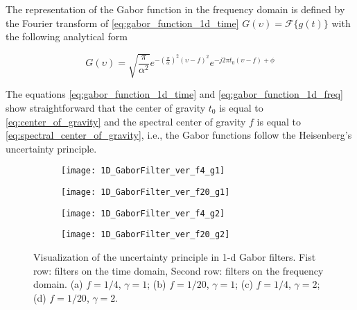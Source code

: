 The representation of the Gabor function in the frequency domain is defined by the Fourier transform of \eqref{eq:gabor_function_1d_time} $G(\upsilon) = \mathcal{F}\{g(t)\}$ with the following analytical form

\begin{equation}\label{eq:gabor_function_1d_freq}
    G(\upsilon) =  \sqrt{\frac{\pi}{\alpha^2}} e ^{-\left(\frac{\pi}{\alpha}\right) ^{2} (\upsilon-f)^2} e ^{-j 2 \pi t_0 (\upsilon-f) + \phi}
\end{equation}

The equations \eqref{eq:gabor_function_1d_time} and \eqref{eq:gabor_function_1d_freq} show straightforward that the center of gravity $t_0$ is equal to \eqref{eq:center_of_gravity} and the spectral center of gravity $f$ is equal to \eqref{eq:spectral_center_of_gravity}, i.e., the Gabor functions follow the Heisenberg's uncertainty principle.   

\begin{figure}[!ht] 
	\centering
	\begin{subfigure}[b]{0.23\textwidth}
		\centering
		\texttt{[image: 1D\_GaborFilter\_ver\_f4\_g1]}
		\caption{}
		\label{fig:1D_GaborFilter_f4_g1}
	\end{subfigure}
	\begin{subfigure}[b]{0.23\textwidth}
		\centering
		\texttt{[image: 1D\_GaborFilter\_ver\_f20\_g1]}
		\caption{}
		\label{fig:1D_GaborFilter_f20_g1}
	\end{subfigure}
	\begin{subfigure}[b]{0.23\textwidth}
		\centering
		\texttt{[image: 1D\_GaborFilter\_ver\_f4\_g2]}
		\caption{}
		\label{fig:1D_GaborFilter_f4_g2}
	\end{subfigure}
	\begin{subfigure}[b]{0.23\textwidth}
		\centering
		\texttt{[image: 1D\_GaborFilter\_ver\_f20\_g2]}
		\caption{}
		\label{fig:1D_GaborFilter_f20_g2}
	\end{subfigure}
		

  \caption{Visualization of the uncertainty principle in 1-d Gabor filters. Fist row: filters on the time domain, Second row: filters on the frequency domain. (a) $f = 1/4$, $\gamma = 1$; (b) $f = 1/20$, $\gamma = 1$; (c) $f = 1/4$, $\gamma = 2$; (d) $f = 1/20$, $\gamma = 2$.}
  \label{fig:examples_1D_GaborFilter}
\end{figure}

